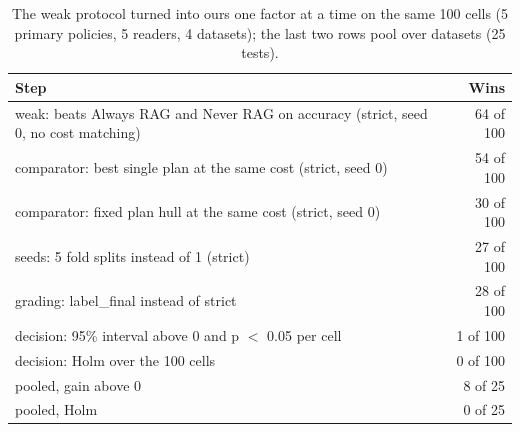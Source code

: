 \begin{table}[t]
\centering\small
\setlength{\tabcolsep}{4pt}
\caption{The weak protocol turned into ours one factor at a time on the same 100 cells (5 primary policies, 5 readers, 4 datasets); the last two rows pool over datasets (25 tests).}
\label{tab:robust_ablation}
\begin{tabular*}{\linewidth}{@{\extracolsep{\fill}}lr}
\toprule
Step & Wins \\
\midrule
weak: beats Always RAG and Never RAG on accuracy (strict, seed 0, no cost matching) & 64 of 100 \\
comparator: best single plan at the same cost (strict, seed 0) & 54 of 100 \\
comparator: fixed plan hull at the same cost (strict, seed 0) & 30 of 100 \\
seeds: 5 fold splits instead of 1 (strict) & 27 of 100 \\
grading: label\_final instead of strict & 28 of 100 \\
decision: 95\% interval above 0 and p $<$ 0.05 per cell & 1 of 100 \\
decision: Holm over the 100 cells & 0 of 100 \\
pooled, gain above 0 & 8 of 25 \\
pooled, Holm & 0 of 25 \\
\bottomrule
\end{tabular*}
\end{table}
